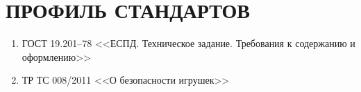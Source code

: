 \chapter*{\hfill ПРОФИЛЬ СТАНДАРТОВ \hfill}
\begin{enumerate}
	\item ГОСТ 19.201–78 <<ЕСПД. Техническое задание. Требования к содержанию и оформлению>>
	\item ТР ТС 008/2011 <<О безопасности игрушек>>
\end{enumerate}
